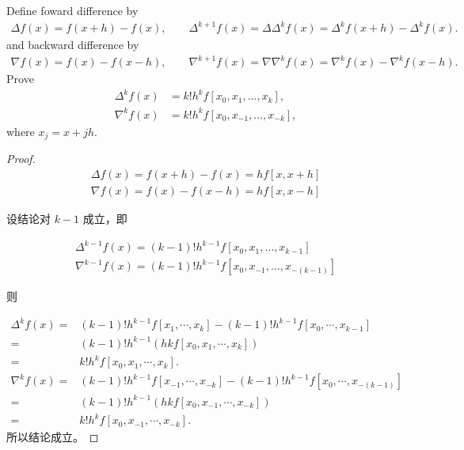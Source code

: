 \documentclass[lang=cn,a4paper,newtx,bibend=bibtex]{elegantpaper}
\begin{document}
\begin{prob}
    Define foward difference by
    \begin{align*}
      \Delta f(x) = f(x+h) - f(x) ,\qquad \Delta^{k+1} f(x) = \Delta \Delta^k f(x) = \Delta^k f(x+h) - \Delta^k f(x).
    \end{align*}
    and backward difference by
    \begin{align*}
      \nabla f(x) = f(x) - f(x-h), \qquad \nabla^{k+1} f(x) = \nabla \nabla^k f(x) = \nabla^k f(x) - \nabla^k f(x-h).
    \end{align*}
    Prove
    \begin{align*}
      \Delta^k f(x) &= k!h^kf[x_0,x_1,\ldots,x_k],\\
      \nabla^k f(x) &= k!h^kf[x_0,x_{-1},\ldots,x_{-k}],
    \end{align*}
    where $x_j=x+jh$.
\end{prob}
\begin{proof}
  \begin{equation*}
    \begin{aligned}
      \Delta f(x) = f(x+h) - f(x) = hf[x,x+h]\\
      \nabla f(x) = f(x) - f(x-h) = hf[x,x-h]
    \end{aligned}
    \end{equation*}
    
    设结论对 $k-1$ 成立，即
    
    \begin{equation*}
    \begin{aligned}
      \Delta^{k-1} f(x) = (k-1)! h^{k-1} f[x_0,x_1,\dots,x_{k-1}]\\
      \nabla^{k-1} f(x) = (k-1)! h^{k-1} f[x_0,x_{-1},\dots,x_{-(k-1)}]
    \end{aligned}
    \end{equation*}
    
    则
    
    \begin{equation*}
    \begin{aligned}
      \Delta^k f(x) = & (k-1)! h^{k-1} f[x_1,\cdots,x_k] - (k-1)! h^{k-1} f[x_0,\cdots,x_{k-1}]\\
      = & (k-1)! h^{k-1} (hkf[x_0,x_1,\cdots,x_k])\\
      = & k! h^k f[x_0,x_1,\cdots,x_k].\\
      \nabla^k f(x) = & (k-1)! h^{k-1} f[x_{-1},\cdots,x_{-k}] - (k-1)! h^{k-1} f[x_0,\cdots,x_{-(k-1)}]\\
      = & (k-1)! h^{k-1} (hkf[x_0,x_{-1},\cdots,x_{-k}])\\
      = & k! h^k f[x_0,x_{-1},\cdots,x_{-k}].
    \end{aligned}
    \end{equation*}
    所以结论成立。
\end{proof}
\end{document}
